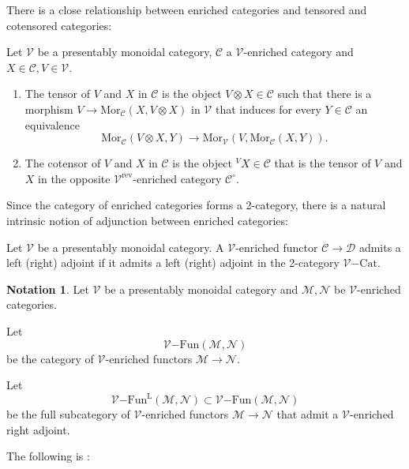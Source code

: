 \documentclass[10pt,oneside]{article}
\numberwithin{equation}{section} %
\numberwithin{figure}{section} %
\theoremstyle{plain}
\theoremstyle{definition}
\newtheorem{notation}[thm]{Notation}
\newcommand{\mC}{{\mathcal C}}
\newcommand{\mD}{{\mathcal D}}
\newcommand{\mM}{{\mathcal M}}
\newcommand{\mN}{{\mathcal N}}
\newcommand{\mV}{{\mathcal V}}
\renewcommand{\L}{{\mathrm L}}
\newcommand{\rev}{{\mathrm{rev}}}
\newcommand{\ot}{\otimes}
\newcommand{\Cat}{\mathrm{Cat}}
\newcommand{\Fun}{\mathrm{Fun}}
\newcommand{\Mor}{{\mathrm{Mor}}}
\begin{document}
There is a close relationship between enriched categories
and tensored and cotensored categories:

\begin{definition}Let $\mV$ be a presentably monoidal category, $\mC$ a $\mV$-enriched category and $X \in \mC, V \in \mV.$	 
\begin{enumerate}[\normalfont(1)]\setlength{\itemsep}{-2pt}
\item The tensor of $V$ and $X$ in $\mC$ is the object $V \ot X \in \mC $ such that there is a morphism
$V \to \Mor_\mC(X, V \ot X) $ in $\mV$ that induces for every $Y \in \mC$ an equivalence
$$ \Mor_\mC(V \ot X,Y) \to \Mor_\mV(V, \Mor_\mC(X,Y)). $$ 
\item The cotensor of $V$ and $X$ in $\mC$ is the object ${^V X} \in \mC $ that is the tensor of $V $ and $X$ in the opposite $\mV^\rev$-enriched category $\mC^\circ.$
\end{enumerate}	
\end{definition}



Since the category of enriched categories forms a 2-category, there is a natural intrinsic notion of adjunction between enriched categories:

\begin{definition}Let $\mV$ be a presentably monoidal category.
A $\mV$-enriched functor $\mC \to \mD$ admits a left (right) adjoint if
it admits a left (right) adjoint in the 2-category $\mV \mathrm{-}\Cat.$

\end{definition}

\begin{notation}Let $\mV$ be a presentably monoidal category and $\mM, \mN$ be $\mV$-enriched categories.

Let $$\mV\mathrm{-}\Fun(\mM,\mN)$$ be the category of $\mV$-enriched functors
$\mM \to \mN.$

Let $$\mV\mathrm{-}\Fun^\L(\mM,\mN) \subset {\mV\mathrm{-}\Fun(\mM,\mN)}$$ be the full subcategory of $\mV$-enriched functors
$\mM \to \mN$ that admit a $\mV$-enriched right adjoint.
    
\end{notation}

The following is \cite[Remark 2.55]{heine2024bienriched}:
\end{document}
